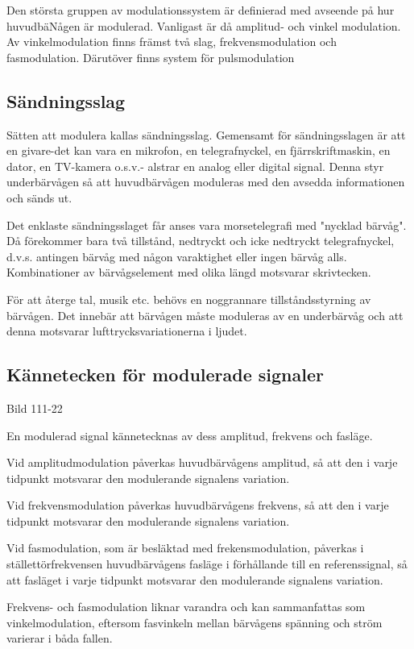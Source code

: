 Den största gruppen av modulationssystem är definierad med avseende på hur huvudbäNågen är
modulerad. Vanligast är då amplitud- och vinkel modulation. Av vinkelmodulation finns
främst två slag, frekvensmodulation och fasmodulation. Därutöver finns system för
pulsmodulation

\subsection{Sändningsslag}

Sätten att modulera kallas sändningsslag. Gemensamt för sändningsslagen är att en
givare-det kan vara en mikrofon, en telegrafnyckel, en fjärrskriftmaskin, en dator, en
TV-kamera o.s.v.- alstrar en analog eller digital signal. Denna styr underbärvågen så att
huvudbärvågen moduleras med den avsedda informationen och sänds ut.

Det enklaste sändningsslaget får anses vara morsetelegrafi med "nycklad bärvåg".
Då förekommer bara två tillstånd, nedtryckt och icke nedtryckt telegrafnyckel, d.v.s.
antingen bärvåg med någon varaktighet eller ingen bärvåg alls. Kombinationer av
bärvågselement med olika längd motsvarar skrivtecken.

För att återge tal, musik etc. behövs en noggrannare tillståndsstyrning av bärvågen.
Det innebär att bärvågen måste moduleras av en underbärvåg och att denna motsvarar
lufttrycksvariationerna i ljudet.

\subsection{Kännetecken för modulerade signaler}

Bild 111-22

En modulerad signal kännetecknas av dess amplitud, frekvens och fasläge.

Vid amplitudmodulation påverkas huvudbärvågens amplitud, så att den i varje tidpunkt
motsvarar den modulerande signalens variation.

Vid frekvensmodulation påverkas huvudbärvågens frekvens, så att den i varje tidpunkt
motsvarar den modulerande signalens variation.

Vid fasmodulation, som är besläktad med frekensmodulation, påverkas i ställettörfrekvensen
huvudbärvågens fasläge i förhållande till en referenssignal, så att fasläget i varje
tidpunkt motsvarar den modulerande signalens variation.

Frekvens- och fasmodulation liknar varandra och kan sammanfattas som vinkelmodulation,
eftersom fasvinkeln mellan bärvågens spänning och ström varierar i båda fallen.

